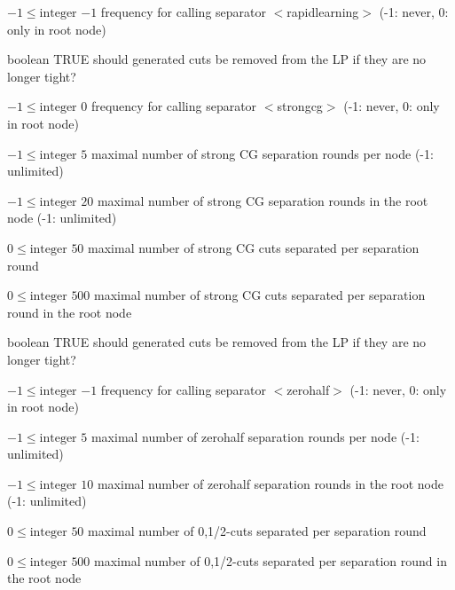 %
{$-1\leq\textrm{integer}$}%
{$-1$}%
{frequency for calling separator $<$rapidlearning$>$ (-1: never, 0: only in root node)}%
{}

%
{boolean}%
{TRUE}%
{should generated cuts be removed from the LP if they are no longer tight?}%
{}

%
{$-1\leq\textrm{integer}$}%
{$0$}%
{frequency for calling separator $<$strongcg$>$ (-1: never, 0: only in root node)}%
{}

%
{$-1\leq\textrm{integer}$}%
{$5$}%
{maximal number of strong CG separation rounds per node (-1: unlimited)}%
{}

%
{$-1\leq\textrm{integer}$}%
{$20$}%
{maximal number of strong CG separation rounds in the root node (-1: unlimited)}%
{}

%
{$0\leq\textrm{integer}$}%
{$50$}%
{maximal number of strong CG cuts separated per separation round}%
{}

%
{$0\leq\textrm{integer}$}%
{$500$}%
{maximal number of strong CG cuts separated per separation round in the root node}%
{}

%
{boolean}%
{TRUE}%
{should generated cuts be removed from the LP if they are no longer tight?}%
{}

%
{$-1\leq\textrm{integer}$}%
{$-1$}%
{frequency for calling separator $<$zerohalf$>$ (-1: never, 0: only in root node)}%
{}

%
{$-1\leq\textrm{integer}$}%
{$5$}%
{maximal number of zerohalf separation rounds per node (-1: unlimited)}%
{}

%
{$-1\leq\textrm{integer}$}%
{$10$}%
{maximal number of zerohalf separation rounds in the root node (-1: unlimited)}%
{}

%
{$0\leq\textrm{integer}$}%
{$50$}%
{maximal number of {0,1/2}-cuts separated per separation round}%
{}

%
{$0\leq\textrm{integer}$}%
{$500$}%
{maximal number of {0,1/2}-cuts separated per separation round in the root node}%
{}

